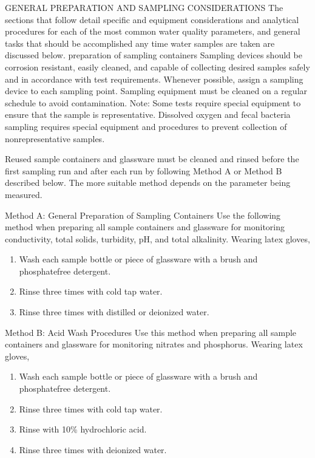 \documentclass{article}
\begin{document}
GENERAL PREPARATION AND SAMPLING CONSIDERATIONS The sections that follow
detail specific and equipment considerations and analytical procedures
for each of the most common water quality parameters, and general tasks
that should be accomplished any time water samples are taken are
discussed below. preparation of sampling containers Sampling devices
should be corrosion resistant, easily cleaned, and capable of collecting
desired samples safely and in accordance with test requirements.
Whenever possible, assign a sampling device to each sampling point.
Sampling equipment must be cleaned on a regular schedule to avoid
contamination. Note: Some tests require special equipment to ensure that
the sample is representative. Dissolved oxygen and fecal bacteria
sampling requires special equipment and procedures to prevent collection
of nonrepresentative samples.

Reused sample containers and glassware must be cleaned and rinsed before
the first sampling run and after each run by following Method A or
Method B described below. The more suitable method depends on the
parameter being measured.

Method A: General Preparation of Sampling Containers Use the following
method when preparing all sample containers and glassware for monitoring
conductivity, total solids, turbidity, pH, and total alkalinity. Wearing
latex gloves,

\begin{enumerate}
\item
  Wash each sample bottle or piece of glassware with a brush and
  phosphatefree detergent.
\item
  Rinse three times with cold tap water.
\item
  Rinse three times with distilled or deionized water.
\end{enumerate}

Method B: Acid Wash Procedures Use this method when preparing all sample
containers and glassware for monitoring nitrates and phosphorus. Wearing
latex gloves,

\begin{enumerate}
\item
  Wash each sample bottle or piece of glassware with a brush and
  phosphatefree detergent.
\item
  Rinse three times with cold tap water.
\item
  Rinse with 10\% hydrochloric acid.
\item
  Rinse three times with deionized water.
\end{enumerate}
\end{document}
